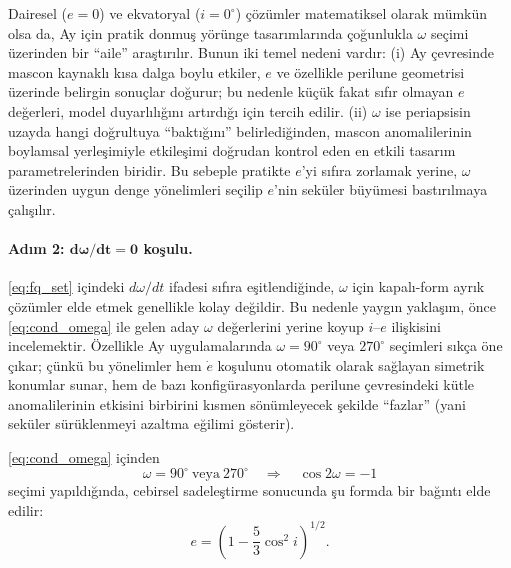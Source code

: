 Dairesel ($e=0$) ve ekvatoryal ($i=0^\circ$) çözümler matematiksel olarak mümkün olsa da, Ay için pratik donmuş yörünge
tasarımlarında çoğunlukla $\omega$ seçimi üzerinden bir ``aile'' araştırılır. Bunun iki temel nedeni vardır:
(i) Ay çevresinde mascon kaynaklı kısa dalga boylu etkiler, $e$ ve özellikle perilune geometrisi üzerinde belirgin
sonuçlar doğurur; bu nedenle küçük fakat sıfır olmayan $e$ değerleri, model duyarlılığını artırdığı için tercih edilir.
(ii) $\omega$ ise periapsisin uzayda hangi doğrultuya ``baktığını'' belirlediğinden, mascon anomalilerinin boylamsal
yerleşimiyle etkileşimi doğrudan kontrol eden en etkili tasarım parametrelerinden biridir. Bu sebeple pratikte $e$'yi
sıfıra zorlamak yerine, $\omega$ üzerinden uygun denge yönelimleri seçilip $e$'nin seküler büyümesi bastırılmaya çalışılır.

\paragraph{Adım 2: $\boldsymbol{d\omega/dt=0}$ koşulu.}
\eqref{eq:fq_set} içindeki $d\omega/dt$ ifadesi sıfıra eşitlendiğinde, $\omega$ için kapalı-form ayrık çözümler elde etmek
genellikle kolay değildir. Bu nedenle yaygın yaklaşım, önce \eqref{eq:cond_omega} ile gelen aday $\omega$ değerlerini
yerine koyup $i$--$e$ ilişkisini incelemektir. Özellikle Ay uygulamalarında $\omega=90^\circ$ veya $270^\circ$ seçimleri
sıkça öne çıkar; çünkü bu yönelimler hem $\dot e$ koşulunu otomatik olarak sağlayan simetrik konumlar sunar, hem de
bazı konfigürasyonlarda perilune çevresindeki kütle anomalilerinin etkisini birbirini kısmen sönümleyecek şekilde
``fazlar'' (yani seküler sürüklenmeyi azaltma eğilimi gösterir).

\eqref{eq:cond_omega} içinden
\begin{equation}
\omega=90^\circ \ \text{veya}\ 270^\circ
\quad\Rightarrow\quad
\cos 2\omega = -1
\end{equation}
seçimi yapıldığında, cebirsel sadeleştirme sonucunda şu formda bir bağıntı elde edilir:
\begin{equation}
\label{eq:e_i_relation}
e = \left( 1 - \frac{5}{3}\cos^{2} i \right)^{1/2}.
\end{equation}

